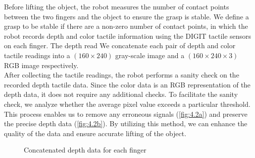\documentclass[11pt, a4paper]{report}
\theoremstyle{definition}
\begin{document}
Before lifting the object, the robot measures the number of contact points between the two fingers and the object to ensure the grasp is stable. We define a grasp to be stable if there are a non-zero number of contact points, in which the robot records depth and color tactile information using the DIGIT \cite{Lambeta2020DIGIT} tactile sensors on each finger. The depth read We concatenate each pair of depth and color tactile readings into a $(160\times240)$ gray-scale image and a $(160\times240\times3)$ RGB image respectively.\\

After collecting the tactile readings, the robot performs a sanity check on the recorded depth tactile data. Since the color data is an RGB representation of the depth data, it does not require any additional checks. To facilitate the sanity check, we analyze whether the average pixel value exceeds a particular threshold. This process enables us to remove any erroneous signals (\ref{fig:4.2a}) and preserve the precise depth data (\ref{fig:4.2b}). By utilizing this method, we can enhance the quality of the data and ensure accurate lifting of the object.

\begin{figure}[H]%
    \centering
    \qquad
    \caption{Concatenated depth data for each finger}%
    \label{fig:4.2}%
\end{figure}
\end{document}
